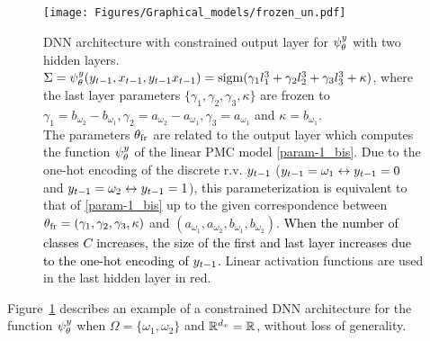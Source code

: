 \begin{figure}[H]
  \begin{minipage}[c]{\textwidth}
    \centering
    {
      \texttt{[image: Figures/Graphical\_models/frozen\_un.pdf]}
    }
    \end{minipage}%
    \vspace{.3cm}
  \caption{DNN architecture with constrained output layer for $\psi^{y}_{\theta}$ with two hidden layers.
  $\Sigma=\psi^{y}_{\theta}(y_{t-1},x_{t-1},y_{t-1}x_{t-1}) ={\rm sigm}
  (\textcolor{black}{\gamma_1} l^3_1+ \textcolor{black}{\gamma_2}l^3_2+
  \textcolor{black}{\gamma_3}l^3_3+ \textcolor{black}{\kappa})$, where the last
  layer parameters $ \{\gamma_1,\gamma_2,\gamma_3,\kappa\}$ are frozen to
  $\gamma_1=b_{\omega_2}-b_{\omega_1}, \gamma_2=a_{\omega_2}-a_{\omega_1},
  \gamma_3=a_{\omega_1}$ and $\kappa=b_{\omega_1}$.\\
  The parameters $\theta_{\mathrm{fr}}$ are related to the output layer which 
  computes the function $\psi^{y}_{\theta}$ of the linear PMC model \eqref{param-1_bis}.
  Due to the one-hot encoding of the discrete r.v. $y_{t-1}$
  ($y_{t-1}=\omega_1 \leftrightarrow y_{t-1}=0$ and $y_{t-1}=\omega_2 \leftrightarrow y_{t-1}=1$),
  this parameterization 
  is equivalent to that of \eqref{param-1_bis}
  up to the  given
  correspondence between $\theta_{\mathrm{fr}}=(\gamma_1, \gamma_2, \gamma_3,\kappa)$
  and $(a_{\omega_1},a_{\omega_2},b_{\omega_1},b_{\omega_2})$. \textcolor{black}{When the number 
  of classes $C$ increases, the size of the first
  and last layer increases due to the one-hot encoding of $y_{t-1}$.}
  Linear activation functions are used in the last hidden layer in red.
  }
  \label{fig:constrained_archi}
\end{figure}
Figure~\ref{fig:constrained_archi} describes an example 
of a constrained DNN architecture for the function $\psi^{y}_{\theta}$
when $\Omega=\{\omega_1,\omega_2\}$ and $\mathbb{R}^{d_{x}} = \mathbb{R}$,
without loss of generality. 

